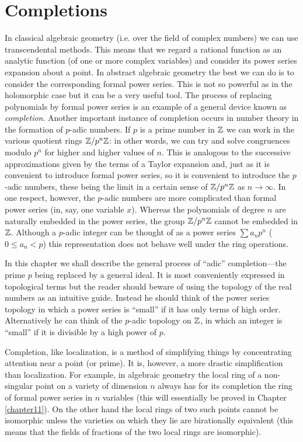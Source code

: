\chapter{Completions}\label{chapter10}

In classical algebraic geometry (i.e. over the field of complex numbers) we can use transcendental methods. This means that we regard a rational function as an analytic function (of one or more complex variables) and consider its power series expansion about a point. In abstract algebraic geometry the best we can do is to consider the corresponding formal power series. This is not so powerful as in the holomorphic case but it can be a very useful tool. The process of replacing polynomials by formal power series is an example of a general device known as \emph{completion}. Another important instance of completion occurs in number theory in the formation of $p$-adic numbers. If $p$ is a prime number in $\mathbb{Z}$ we can work in the various quotient rings $\mathbb{Z}/p^n\mathbb{Z}$: in other words, we can try and solve congruences modulo $p^n$ for higher and higher values of $n$. This is analogous to the successive approximations given by the terms of a Taylor expansion and, just as it is convenient to introduce formal power series, so it is convenient to introduce the $p$-adic numbers, these being the limit in a certain sense of $\mathbb{Z}/p^n\mathbb{Z}$ as $n \to \infty$. In one respect, however, the $p$-adic numbers are more complicated than formal power series (in, say, one variable $x$). Whereas the polynomials of degree $n$ are naturally embedded in the power series, the group $\mathbb{Z}/p^n\mathbb{Z}$ cannot be embedded in $\mathbb{Z}$. Although a $p$-adic integer can be thought of as a power series $\sum a_n p^n$ ($0 \leq a_n < p$) this representation does not behave well under the ring operations.

In this chapter we shall describe the general process of ``adic'' completion---the prime $p$ being replaced by a general ideal. It is most conveniently expressed in topological terms but the reader should beware of using the topology of the real numbers as an intuitive guide. Instead he should think of the power series topology in which a power series is ``small'' if it has only terms of high order. Alternatively he can think of the $p$-adic topology on $\mathbb{Z}$, in which an integer is ``small'' if it is divisible by a high power of $p$.

Completion, like localization, is a method of simplifying things by concentrating attention near a point (or prime). It is, however, a more drastic simplification than localization. For example, in algebraic geometry the local ring of a non-singular point on a variety of dimension $n$ always has for its completion the ring of formal power series in $n$ variables (this will essentially be proved in Chapter \ref{chapter11}). On the other hand the local rings of two such points cannot be isomorphic unless the varieties on which they lie are birationally equivalent (this means that the fields of fractions of the two local rings are isomorphic).

